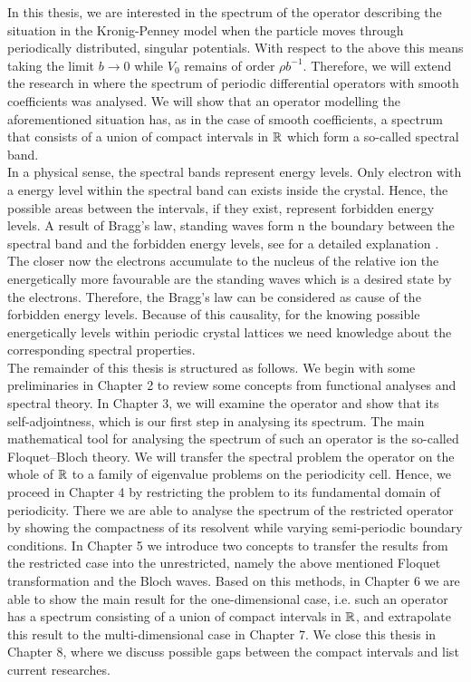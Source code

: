 In this thesis, we are interested in the spectrum of the operator describing the situation in the Kronig-Penney model when the particle moves through periodically distributed, singular potentials. With respect to the above this means taking the limit $b \rightarrow 0$ while $V_{0}$ remains of order $\rho b^{-1}$. Therefore, we will extend the research in \cite{dorfler2011photonic} where the spectrum of periodic differential operators with smooth coefficients was analysed. We will show that an operator modelling the aforementioned situation has, as in the case of smooth coefficients, a spectrum that consists of a union of compact intervals in $\mathbb{R}$ which form a so-called spectral band. 
~\\

In a physical sense, the spectral bands represent energy levels. Only electron with a energy level within the spectral band can exists inside the crystal. Hence, the possible areas between the intervals, if they exist, represent forbidden energy levels. A result of Bragg's law, standing waves form n the boundary between the spectral band and the forbidden energy levels, see for a detailed explanation \cite[section 3.2]{heering2002elektrophysik}. The closer now the electrons accumulate to the nucleus of the relative ion the energetically more favourable are the standing waves which is a desired state by the electrons. Therefore, the Bragg's law can be considered as cause of the forbidden energy levels. Because of this causality, for the knowing possible energetically levels within periodic crystal lattices we need knowledge about the corresponding spectral properties.
~\\

The remainder of this thesis is structured as follows. We begin with some preliminaries in Chapter 2 to review some concepts from functional analyses and spectral theory. In Chapter 3, we will examine the operator and show that its self-adjointness, which is our first step in analysing its spectrum. The main mathematical tool for analysing the spectrum of such an operator is the so-called Floquet–Bloch theory. We will transfer the spectral problem the operator on the whole of $\mathbb{R}$ to a family of eigenvalue problems on the periodicity cell. Hence, we proceed in Chapter 4 by restricting the problem to its fundamental domain of periodicity. There we are able to analyse the spectrum of the restricted operator by showing the compactness of its resolvent while varying  semi-periodic boundary conditions. In Chapter 5 we introduce two concepts to transfer the results from the restricted case into the unrestricted, namely the above mentioned Floquet transformation and the Bloch waves. Based on this methods, in Chapter 6 we are able to show the main result for the one-dimensional case, i.e. such an operator has a spectrum consisting of a union of compact intervals in $\mathbb{R}$, and extrapolate this result to the multi-dimensional case in Chapter 7. We close this thesis in Chapter 8, where we discuss possible gaps between the compact intervals and list current researches.